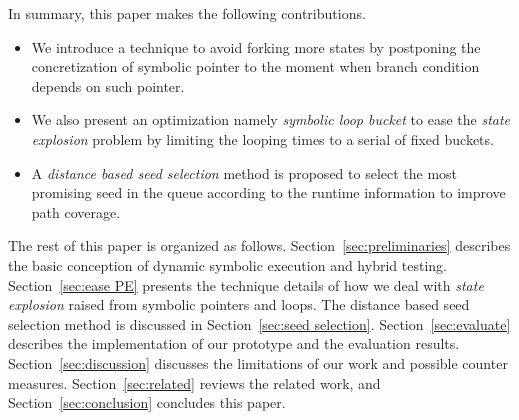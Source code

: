 In summary, this paper makes the following contributions.
\begin{itemize}
\item We introduce a technique to avoid forking more states by postponing the concretization of symbolic pointer to the moment when branch condition depends on such pointer.  

\item We also present an optimization namely \emph{symbolic loop bucket} to ease the \textit{state explosion} problem by limiting the looping times to a serial of fixed buckets.

\item A \emph{distance based seed selection} method is proposed to select the most promising seed in the queue according to the runtime information to improve path coverage. 
\end{itemize}


The rest of this paper is organized as follows. 
 Section~\ref{sec:preliminaries} describes the basic conception of dynamic symbolic execution and hybrid testing. 
 Section~\ref{sec:ease PE} presents the technique details of how we deal with \textit{state explosion} raised from symbolic pointers and loops. The distance based seed selection method is discussed in Section~\ref{sec:seed selection}. Section~\ref{sec:evaluate} describes the implementation of our prototype and the evaluation results. Section~\ref{sec:discussion} discusses the limitations of our work and possible counter measures. Section~\ref{sec:related} reviews the related work, and Section~\ref{sec:conclusion} concludes this paper.

